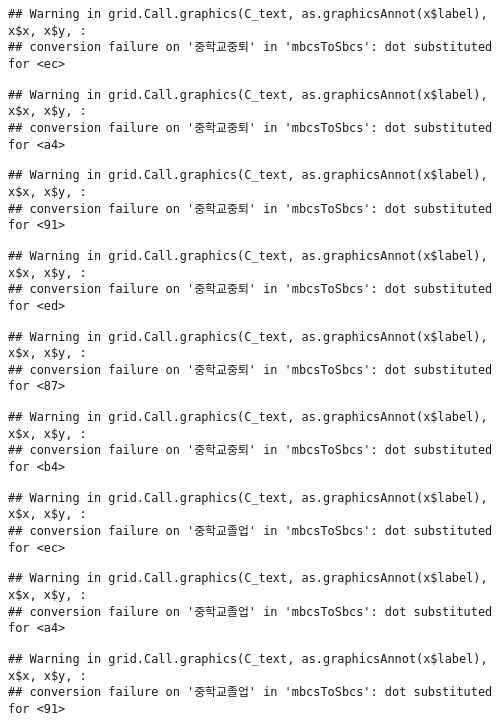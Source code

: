 \documentclass[
]{article}
\begin{document}
\begin{verbatim}
## Warning in grid.Call.graphics(C_text, as.graphicsAnnot(x$label), x$x, x$y, :
## conversion failure on '중학교중퇴' in 'mbcsToSbcs': dot substituted for <ec>
\end{verbatim}

\begin{verbatim}
## Warning in grid.Call.graphics(C_text, as.graphicsAnnot(x$label), x$x, x$y, :
## conversion failure on '중학교중퇴' in 'mbcsToSbcs': dot substituted for <a4>
\end{verbatim}

\begin{verbatim}
## Warning in grid.Call.graphics(C_text, as.graphicsAnnot(x$label), x$x, x$y, :
## conversion failure on '중학교중퇴' in 'mbcsToSbcs': dot substituted for <91>
\end{verbatim}

\begin{verbatim}
## Warning in grid.Call.graphics(C_text, as.graphicsAnnot(x$label), x$x, x$y, :
## conversion failure on '중학교중퇴' in 'mbcsToSbcs': dot substituted for <ed>
\end{verbatim}

\begin{verbatim}
## Warning in grid.Call.graphics(C_text, as.graphicsAnnot(x$label), x$x, x$y, :
## conversion failure on '중학교중퇴' in 'mbcsToSbcs': dot substituted for <87>
\end{verbatim}

\begin{verbatim}
## Warning in grid.Call.graphics(C_text, as.graphicsAnnot(x$label), x$x, x$y, :
## conversion failure on '중학교중퇴' in 'mbcsToSbcs': dot substituted for <b4>
\end{verbatim}

\begin{verbatim}
## Warning in grid.Call.graphics(C_text, as.graphicsAnnot(x$label), x$x, x$y, :
## conversion failure on '중학교졸업' in 'mbcsToSbcs': dot substituted for <ec>
\end{verbatim}

\begin{verbatim}
## Warning in grid.Call.graphics(C_text, as.graphicsAnnot(x$label), x$x, x$y, :
## conversion failure on '중학교졸업' in 'mbcsToSbcs': dot substituted for <a4>
\end{verbatim}

\begin{verbatim}
## Warning in grid.Call.graphics(C_text, as.graphicsAnnot(x$label), x$x, x$y, :
## conversion failure on '중학교졸업' in 'mbcsToSbcs': dot substituted for <91>
\end{verbatim}
\end{document}
